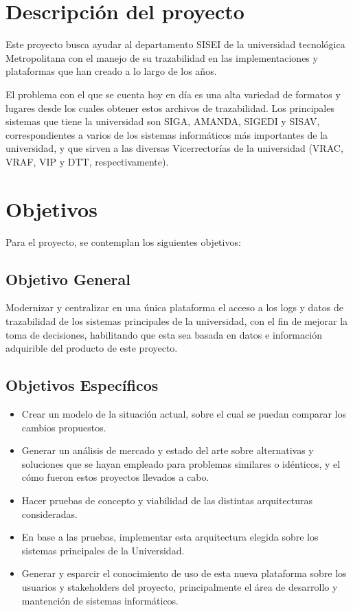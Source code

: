\section{Descripción del proyecto}

Este proyecto busca ayudar al departamento SISEI de la universidad tecnológica Metropolitana con el manejo de su trazabilidad en las implementaciones y plataformas que han creado a lo largo de los años.

El problema con el que se cuenta hoy en día es una alta variedad de formatos y lugares desde los cuales obtener estos archivos de trazabilidad. Los principales sistemas que tiene la universidad son SIGA, AMANDA, SIGEDI y SISAV, correspondientes a varios de los sistemas informáticos más importantes de la universidad, y que sirven a las diversas Vicerrectorías de la universidad (VRAC, VRAF, VIP y DTT, respectivamente).

\lipsum[2]

\section{Objetivos}

Para el proyecto, se contemplan los siguientes objetivos:

\subsection{Objetivo General}

Modernizar y centralizar en una única plataforma el acceso a los logs y datos de trazabilidad de los sistemas principales de la universidad, con el fin de mejorar la toma de decisiones, habilitando que esta sea basada en datos e información adquirible del producto de este proyecto.

\subsection{Objetivos Específicos}

\begin{itemize}
  \item Crear un modelo de la situación actual, sobre el cual se puedan comparar los cambios propuestos.
  \item Generar un análisis de mercado y estado del arte sobre alternativas y soluciones que se hayan empleado para problemas similares o idénticos, y el cómo fueron estos proyectos llevados a cabo.
  \item Hacer pruebas de concepto y viabilidad de las distintas arquitecturas consideradas.
  \item En base a las pruebas, implementar esta arquitectura elegida sobre los sistemas principales de la Universidad.
  \item Generar y esparcir el conocimiento de uso de esta nueva plataforma sobre los usuarios y stakeholders del proyecto, principalmente el área de desarrollo y mantención de sistemas informáticos.
\end{itemize}

